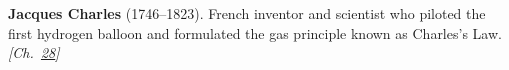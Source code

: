 \textbf{Jacques Charles} (1746–1823). French inventor and scientist who piloted the first hydrogen balloon and formulated the gas principle known as Charles's Law. \emph{[Ch.~\hyperref[ch:negativetemperature]{28}]}

